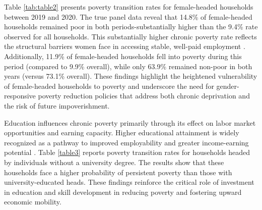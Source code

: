\documentclass[12pt,a4paper]{article}
\begin{document}
Table \autoref{tab:table2} presents poverty transition rates for female-headed households between 2019 and 2020. The true panel data reveal that 14.8\% of female-headed households remained poor in both periods-substantially higher than the 9.4\% rate observed for all households. This substantially higher chronic poverty rate reflects the structural barriers women face in accessing stable, well-paid employment \citep{yoosefi2020challenges}. Additionally, 11.9\% of female-headed households fell into poverty during this period (compared to 9.9\% overall), while only 63.9\% remained non-poor in both years (versus 73.1\% overall). These findings highlight the heightened vulnerability of female-headed households to poverty and underscore the need for gender-responsive poverty reduction policies that address both chronic deprivation and the risk of future impoverishment.

Education influences chronic poverty primarily through its effect on labor market opportunities and earning capacity.  Higher educational attainment is widely recognized as a pathway to improved employability and greater income-earning potential \citep{bilenkisi2015impact}. Table \ref{table3} reports poverty transition rates for households headed by individuals without a university degree. The results show that these households face a higher probability of persistent poverty than those with university-educated heads. These findings reinforce the critical role of investment in education and skill development in reducing poverty and fostering upward economic mobility.
\end{document}

